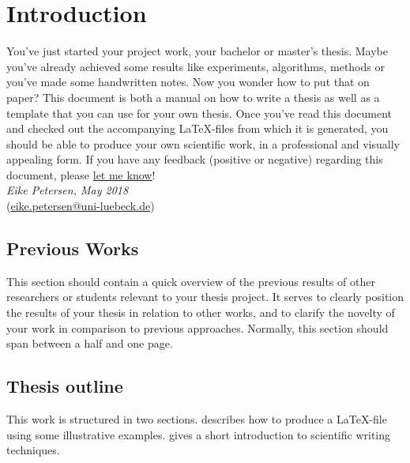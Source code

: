 \chapter{Introduction}
\label{chap:intro}

You've just started your project work, your bachelor or master's thesis. 
Maybe you've already achieved some results like experiments, algorithms, methods or you've made some handwritten notes. 
Now you wonder how to put that on paper?
This document is both a manual on how to write a thesis as well as a template that you can use for your own thesis.
Once you've read this document and checked out the accompanying \LaTeX-files from which it is generated, you should be able to produce your own scientific work, in a professional and visually appealing form.
If you have any feedback (positive or negative) regarding this document, please \href{mailto:eike.petersen@uni-luebeck.de}{let me know}!
\\

\noindent\emph{Eike Petersen, May 2018}\\
\noindent(\href{mailto:eike.petersen@uni-luebeck.de}{eike.petersen@uni-luebeck.de})


\section{Previous Works}
This section should contain a quick overview of the previous results of other researchers or students relevant to your thesis project.
It serves to clearly position the results of your thesis in relation to other works, and to clarify the novelty of your work in comparison to previous approaches.
Normally, this section should span between a half and one page.

\section{Thesis outline}
This work is structured in two sections. 
 describes how to produce a \LaTeX-file using some illustrative examples. 
 gives a short introduction to scientific writing techniques.


